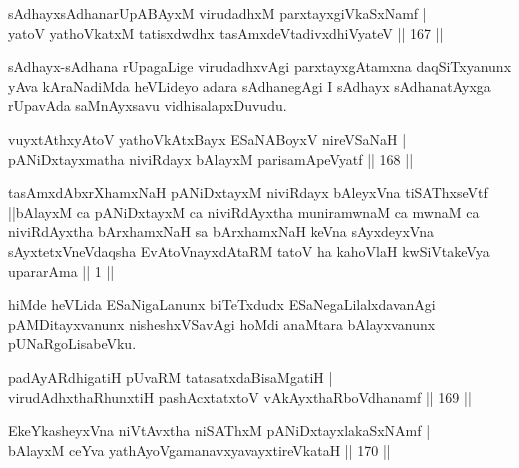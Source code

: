 \begin{shl}
sAdhayxsAdhanarUpABAyxM virudadhxM parxtayxgiVkaSxNamf |\\
yatoV yathoVkatxM tatisxdwdhx tasAmxdeVtadivxdhiVyateV \hfill || 167 ||
\end{shl}

\begin{artha}%
sAdhayx-sAdhana rUpagaLige virudadhxvAgi parxtayxgAtamxna daqSiTxyanunx yAva kAraNadiMda heVLideyo adara sAdhanegAgi I sAdhayx sAdhanatAyxga rUpavAda saMnAyxsavu vidhisalapxDuvudu.
\end{artha}

\begin{shl}
vuyxtAthxyAtoV yathoVkAtxBayx ESaNABoyxV nireVSaNaH |\\
pANiDxtayxmatha niviRdayx bAlayxM parisamApeVyatf \hfill || 168 ||
\end{shl}

\begin{kandikeshl}
tasAmxdAbxrXhamxNaH pANiDxtayxM niviRdayx bAleyxVna tiSAThxseVtf ||bAlayxM ca pANiDxtayxM ca niviRdAyxtha muniramwnaM ca mwnaM ca niviRdAyxtha bArxhamxNaH sa bArxhamxNaH keVna sAyxdeyxVna sAyxtetxVneVdaqsha EvAtoV\s nayxdAtaRM tatoV ha kahoVlaH kwSiVtakeVya upararAma || 1 ||
\end{kandikeshl}

\begin{artha}
hiMde heVLida ESaNigaLanunx biTeTxdudx ESaNegaLilalxdavanAgi pAMDitayxvanunx nisheshxVSavAgi hoMdi anaMtara bAlayxvanunx pUNaRgoLisabeVku.
\end{artha}


\begin{shl}
padAyARdhigatiH pUvaRM tatasatxdaBisaMgatiH |\\
virudAdhxthaRhunxtiH pashAcxtatxtoV vAkAyxthaRboVdhanamf \hfill || 169 ||
\end{shl}

\begin{shl}
EkeYkasheyxVna niVtAvx\s tha niSAThxM pANiDxtayxlakaSxNAmf |\\
bAlayxM ceYva yathAyoVgamanavxyavayxtireVkataH \hfill || 170 ||
\end{shl}

